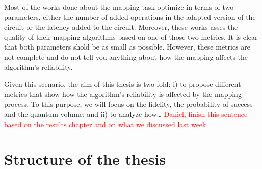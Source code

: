 Most of the works done about the mapping task optimize in terms of two parameters, either the number of added operations in the adapted version of the circuit or the latency added to the circuit. Moreover, these works asses the quality of their mapping algorithms based on one of those two metrics. It is clear that both parameters shold be as small as possible. However, these metrics are not complete and do not tell you anything about how the mapping affects the algorithm's reliability.

Given this scenario, the aim of this thesis is two fold: i) to propose different metrics that show how the algorithm's reliability is affected by the mapping process. To this purpose, we will focus on the fidelity, the probability of success and the quantum volume; and ii) to analyze how\ldots{} \textcolor{red}{Daniel, finish this sentence based on the results chapter and on what we discussed last week}

\section{Structure of the thesis}
\label{sec:orgb7f181d}
